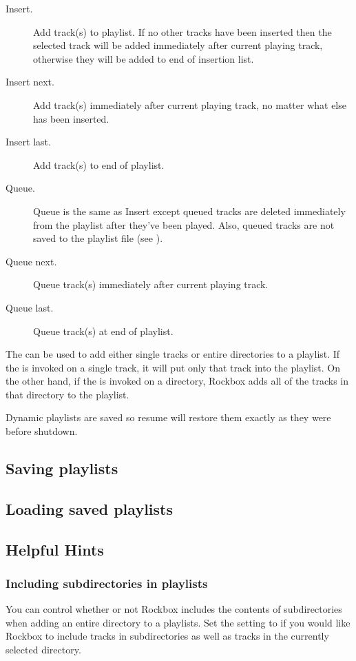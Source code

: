 \begin{description} 
\item [Insert.] Add track(s) to playlist. If no other tracks have been 
  inserted then the selected track will be added immediately after current 
  playing track, otherwise they will be added to end of insertion list. 
  
\item [Insert next.] Add track(s) immediately after current playing 
  track, no matter what else has been inserted. 
  
\item [Insert last.] Add track(s) to end of playlist. 
  
\item [Queue.] Queue is the same as Insert except queued tracks are 
  deleted immediately from the playlist after they've been played. Also, 
  queued tracks are not saved to the playlist file (see 
  ). 
  
\item [Queue next.] Queue track(s) immediately after current playing track.
  
\item [Queue last.] Queue track(s) at end of playlist. 
\end{description}

The  can be used to add either single tracks or 
entire directories to a playlist. If the  is 
invoked on a single track, it will put only that track into the playlist.  
On the other hand, if the  is invoked on a 
directory, Rockbox adds all of the tracks in that directory to the 
playlist.

Dynamic playlists are saved so resume will restore them exactly as they 
were before shutdown.

\subsection{Saving playlists}

\subsection{Loading saved playlists}

\subsection{Helpful Hints}

\subsubsection{Including subdirectories in playlists} 
You can control whether or not Rockbox includes the contents of 
subdirectories when adding an entire directory to a playlists. 
Set the  setting to  if you would like
Rockbox to include tracks in subdirectories as well as tracks in the 
currently selected directory.
